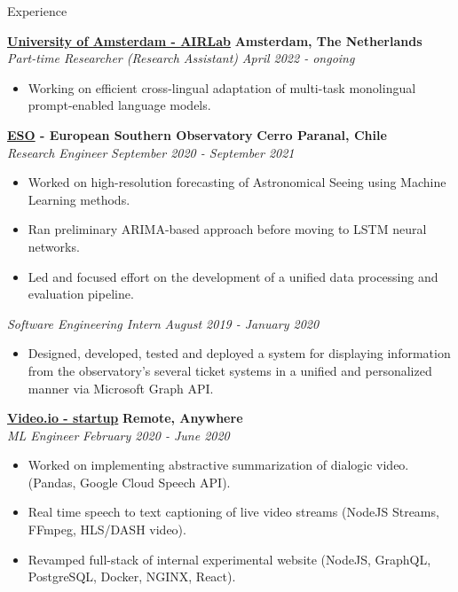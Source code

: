 \documentclass{resume} %
\begin{document}
\begin{rSection}{Experience}

	{\bf \href{https://icai.ai/airlab/}{University of Amsterdam - AIRLab}} \hfill \textbf{Amsterdam,
		The Netherlands}
	\\ \textit{Part-time Researcher (Research Assistant)} \hfill {\em April 2022 - ongoing}
	\begin{itemize}\vspace{-0.5em}
		\item Working on efficient cross-lingual adaptation of multi-task monolingual prompt-enabled
		      language models.
	\end{itemize}

	{\bf \href{https://www.eso.org}{ESO} - European Southern Observatory} \hfill \textbf{Cerro Paranal, Chile}
	\\ \textit{Research Engineer} \hfill {\em September 2020 - September 2021}
	\begin{itemize}\vspace{-0.5em}
		\item Worked on high-resolution forecasting of Astronomical Seeing using Machine Learning
		      methods.
		\item Ran preliminary ARIMA-based approach before moving to LSTM neural networks.
		\item Led and focused effort on the development of a unified data processing and evaluation
		      pipeline.
	\end{itemize}
	\textit{Software Engineering Intern} \hfill {\em August 2019 - January 2020}
	\begin{itemize}\vspace{-0.5em}
		\item Designed, developed, tested and deployed a system for displaying information from the
		      observatory's several ticket systems in a unified and personalized manner via Microsoft Graph
		      API.
	\end{itemize}

	{\bf \href{https://video.io/}{Video.io - startup}} \hfill \textbf{Remote, Anywhere}
	\\ \textit{ML Engineer} \hfill {\em February 2020 - June 2020}
	\begin{itemize}\vspace{-0.5em}
		\item Worked on implementing abstractive summarization of dialogic video. (Pandas, Google Cloud
		      Speech API).
		\item Real time speech to text captioning of live video streams (NodeJS Streams, FFmpeg,
		      HLS/DASH video).
		\item Revamped full-stack of internal experimental website (NodeJS, GraphQL, PostgreSQL, Docker,
		      NGINX, React).
	\end{itemize}


\end{rSection}
\end{document}
